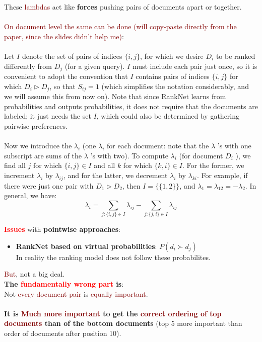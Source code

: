 These \textcolor{Maroon}{lambdas} act like \textbf{forces} pushing pairs of documents apart or together. \\
\\
\textcolor{Maroon}{On document level the same can be done (will copy-paste directly from the paper, since the slides didn't help me)}:
\\
\\
Let $I$ denote the set of pairs of indices $\{i, j\}$, for which we desire $D_{i}$ to be ranked differently from $D_{j}$ (for a given query). $I$ must include each pair just once, so it is convenient to adopt the convention that $I$ contains pairs of indices $\{i, j\}$ for which $D_{i} \triangleright D_{j}$, so that $S_{i j}=1$ (which simplifies the notation considerably, and we will assume this from now on). Note that since RankNet learns from probabilities and outputs probabilities, it does not require that the documents are labeled; it just needs the set $I$, which could also be determined by gathering pairwise preferences. \\
\\
Now we introduce the $\lambda_{i}$ (one $\lambda_{i}$ for each document: note that the $\lambda$ 's with one subscript are sums of the $\lambda$ 's with two). To compute $\lambda_{i}$ (for document $D_{i}$ ), we find all $j$ for which $\{i, j\} \in I$ and all $k$ for which $\{k, i\} \in I$. For the former, we increment $\lambda_{i}$ by $\lambda_{i j}$, and for the latter, we decrement $\lambda_{i}$ by $\lambda_{k i}$. For example, if there were just one pair with $D_{1} \triangleright D_{2}$, then $I=\{\{1,2\}\}$, and $\lambda_{1}=\lambda_{12}=-\lambda_{2}$. In general, we have:
$$
\lambda_{i}=\sum_{j:\{i, j\} \in I} \lambda_{i j}-\sum_{j:\{j, i\} \in I} \lambda_{i j}
$$

\newpage
\textbf{\textcolor{Red}{Issues}} with \textbf{pointwise approaches}:
\begin{itemize}
\setlength\itemsep{0em}
    \item \textbf{RankNet based on virtual probabilities}: $P\left(d_{i} \succ d_{j}\right)$ \\
    In reality the ranking model does not follow these probabilites. 
\end{itemize}

\textcolor{Maroon}{But}, not a big deal. \\

\textbf{The \textcolor{Red}{fundamentally wrong part} is}: \\
Not \textcolor{Maroon}{every document pair} is \textcolor{Maroon}{equally important}.
\\
\\
\textbf{It is \textcolor{Maroon}{Much more important} to get the \textcolor{Maroon}{correct ordering of top documents} than of
the bottom documents} (top 5 more important than order of documents after position 10).

